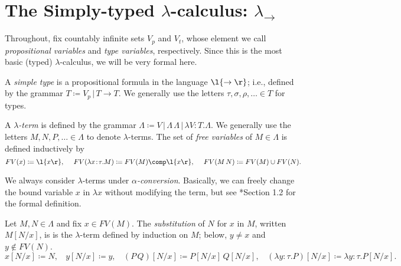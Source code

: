 \documentclass[reqno]{amsart}
\begin{document}
    \section{The Simply-typed $\lambda$-calculus: $\lambda_\rightarrow$}

    Throughout, fix countably infinite sets $V_p$ and $V_t$, whose element we call \textit{propositional variables} and \textit{type variables}, respectively. Since this is the most basic (typed) $\lambda$-calculus, we will be very formal here.

    \begin{definition}
        A \textit{simple type} is a propositional formula in the language $\l\{\rightarrow\r\}$; i.e., defined by the grammar $T\coloneqq V_p\,|\,T\rightarrow T$. We generally use the letters $\tau,\sigma,\rho,\ldots\in T$ for types.
    \end{definition}

    \begin{definition}
        A \textit{$\lambda$-term} is defined by the grammar $\Lambda\coloneqq V\,|\,\Lambda\,\Lambda\,|\,\lambda V\!:\!T.\Lambda$. We generally use the letters $M,N,P,\ldots\in\Lambda$ to denote $\lambda$-terms. The set of \textit{free variables} of $M\in\Lambda$ is defined inductively by
        \begin{equation*}
            FV(x)\coloneqq\l\{x\r\},\ \ \ \ FV(\lambda x\!:\!\tau.M)\coloneqq FV(M)\comp\l\{x\r\},\ \ \ \ FV(M\,N)\coloneqq FV(M)\cup FV(N).
        \end{equation*}
    \end{definition}

    \begin{remark}
        We always consider $\lambda$-terms under \textit{$\alpha$-conversion}. Basically, we can freely change the bound variable $x$ in $\lambda x$ without modifying the term, but see \cite{SU06}*{Section 1.2} for the formal definition.
    \end{remark}

    \begin{definition}
        Let $M,N\in\Lambda$ and fix $x\in FV(M)$. The \textit{substitution} of $N$ for $x$ in $M$, written $M[N/x]$, is is the $\lambda$-term defined by induction on $M$; below, $y\neq x$ and $y\not\in FV(N)$.
        \begin{equation*}
            x[N/x]\coloneqq N,\ \ \ \ y[N/x]\coloneqq y,\ \ \ \ (P\,Q)[N/x]\coloneqq P[N/x]\,Q[N/x],\ \ \ \ (\lambda y\!:\!\tau.P)[N/x]\coloneqq\lambda y\!:\!\tau.P[N/x].
        \end{equation*}
    \end{definition}
\end{document}
